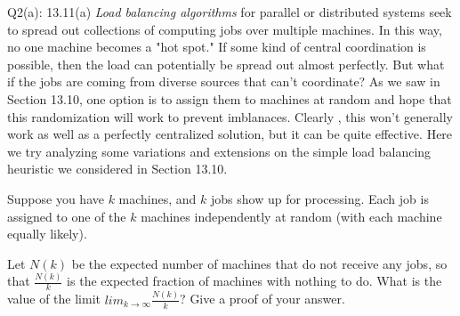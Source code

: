 \begin{problem}
  {Q2(a): 13.11(a)}
  \textit{Load balancing algorithms} for parallel or distributed systems seek to spread out collections of computing
  jobs over multiple machines. In this way, no one machine becomes a "hot spot." If some kind of central coordination is possible, then the load can
  potentially be spread out almost perfectly. But what if the jobs are coming from diverse sources that can't coordinate? As we saw in
  Section 13.10, one option is to assign them to machines at random and hope that this randomization will work to prevent imblanaces. Clearly , this
  won't generally work as well as a perfectly centralized solution, but it can be quite effective. Here we try analyzing some variations and extensions
  on the simple load balancing heuristic we considered in Section 13.10.
  
  Suppose you have $k$ machines, and $k$ jobs show up for processing. Each job is assigned to one of the $k$ machines independently at random (with
  each machine equally likely).

  Let $N(k)$ be the expected number of machines that do not receive any jobs, so that $\frac{N(k)}{k}$ is the expected fraction of machines with
  nothing to do. What is the value of the limit $lim_{k \rightarrow \infty}\frac{N(k)}{k}$? Give a proof of your answer.
\end{problem}
